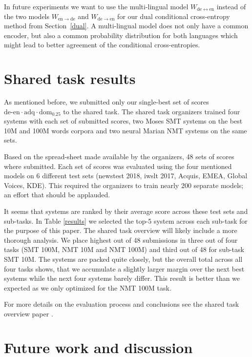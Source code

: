 \documentclass[11pt,a4paper]{article}
\begin{document}
In future experiments we want to use the multi-lingual model $W_{\mathrm{de}\leftrightarrow\mathrm{en}}$ instead of the two models $W_{\mathrm{en}\rightarrow\mathrm{de}}$ and $W_{\mathrm{de}\rightarrow\mathrm{en}}$ for our dual conditional cross-entropy method from Section~\ref{dual}. A multi-lingual model does not only have a common encoder, but also a common probability distribution for both languages which might lead to better agreement of the conditional cross-entropies.


\section{Shared task results}

As mentioned before, we submitted only our single-best set of scores $\mathrm{de\textrm{-}en}\cdot\mathrm{adq}\cdot\mathrm{dom}_{0.25}$ to the shared task. The shared task organizers trained four systems with each set of submitted scores, two Moses SMT \cite{conf/acl/KoehnHBCFBCSMZDBCH07} systems on the best 10M and 100M words corpora and two neural Marian NMT systems on the same sets. 

Based on the spread-sheet made available by the organizers, 48 sets of scores where submitted. Each set of scores was evaluated using the four mentioned models on 6 different test sets (newstest 2018, iwslt 2017, Acquis, EMEA, Global Voices, KDE). This required the organizers to train nearly 200 separate models; an effort that should be applauded. 

It seems that systems are ranked by their average score across these test sets and sub-tasks. In Table \ref{results} we selected the top-5 system across each sub-task for the purpose of this paper. The shared task overview will likely include a more thorough analysis. We place highest out of 48 submissions in three out of four tasks (SMT 100M, NMT 10M and NMT 100M) and third out of 48 for sub-task SMT 10M. The systems are packed quite closely, but the overall total across all four tasks shows, that we accumulate a slightly larger margin over the next best systems while the next four systems barely differ. This result is better than we expected as we only optimized for the NMT 100M task. 

For more details on the evaluation process and conclusions see the shared task overview paper .

\section{Future work and discussion}
\end{document}
